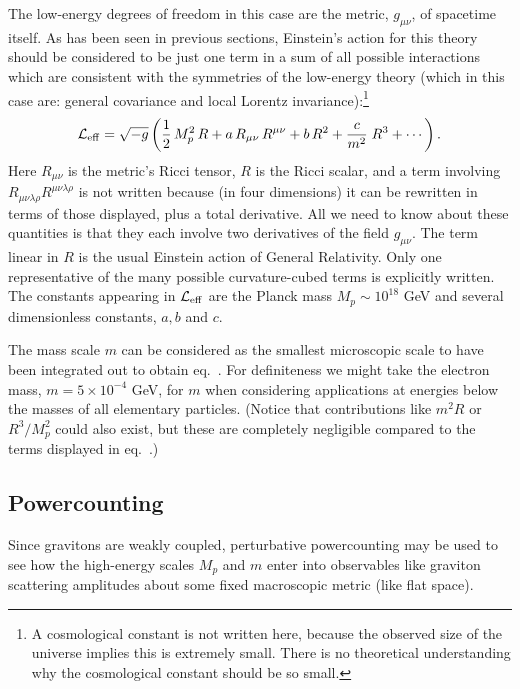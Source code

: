 The low-energy degrees of freedom in this case are the
metric, $g_{\mu\nu}$, of spacetime itself. As has been seen
in previous sections, Einstein's action for this theory should 
be considered to be just one term in a sum of all possible 
interactions which are consistent with the symmetries of
the low-energy theory (which in this case are:
general covariance and local Lorentz invariance):\footnote{A
cosmological constant is not written here, because the observed
size of the universe implies this is extremely small. There is no
theoretical understanding why the cosmological constant should
be so small.}
%
\begin{equation}
\label{gravaction}
{\cal L}_{\rm eff} = \sqrt{- g} \left( \frac12 \, M_p^2 \, R
+ a \, R_{\mu\nu} \, R^{\mu\nu} + b \, R^2 + {c \over m^2} \; R^3
+ \cdots \right) .
\end{equation}
%
Here $R_{\mu\nu}$ is the metric's Ricci tensor, $R$ is the
Ricci scalar, and a term involving $R_{\mu\nu\lambda\rho}
R^{\mu\nu\lambda\rho}$ is not written because (in four
dimensions) it can be rewritten in terms of those displayed,
plus a total derivative. All we need to know about these 
quantities is that they each involve two derivatives 
of the field $g_{\mu\nu}$. The term linear in $R$ is the usual
Einstein action of General Relativity.
Only one representative of the many
possible curvature-cubed terms is explicitly written. 
The constants appearing in ${\cal L}_{\rm eff}$
are the Planck mass $M_p \sim 10^{18}$ GeV and
several dimensionless constants, $a,b$ and $c$.

The mass scale $m$ can be considered as the
smallest microscopic scale to have been integrated out to obtain
eq.~. For definiteness we might take
the electron mass, $m = 5\times 10^{-4}$ GeV, for $m$ when
considering applications at energies below the masses of
all elementary particles. (Notice that contributions like
$m^2 R$ or $R^3/M_p^2$ could also exist,
but these are completely negligible compared to the
terms displayed in eq.~.)

\subsection{Powercounting}

Since gravitons are weakly coupled, perturbative powercounting
may be used to see how the high-energy scales $M_p$ and $m$
enter into observables like graviton scattering amplitudes about
some fixed macroscopic metric (like flat space). 

